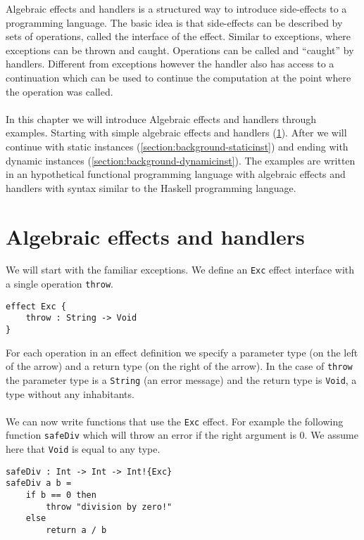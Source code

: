 {
\newcommand\ident[1]{\texttt{#1}}

Algebraic effects and handlers is a structured way to introduce side-effects to a programming language.
The basic idea is that side-effects can be described by sets of operations, called the interface of the effect.
Similar to exceptions, where exceptions can be thrown and caught.
Operations can be called and ``caught'' by handlers.
Different from exceptions however the handler also has access to a continuation which can be used to continue the computation at the point where the operation was called.
\\\\
In this chapter we will introduce Algebraic effects and handlers through examples.
Starting with simple algebraic effects and handlers (\cref{section:background-algeff}). After we will continue with static instances (\cref{section:background-staticinst}) and ending with dynamic instances (\cref{section:background-dynamicinst}). The examples are written in an hypothetical functional programming language with algebraic effects and handlers with syntax similar to the Haskell programming language.

\section{Algebraic effects and handlers} \label{section:background-algeff}
We will start with the familiar exceptions. We define an \ident{Exc} effect interface with a single operation \ident{throw}.

\begin{verbatim}
effect Exc {
	throw : String -> Void
}
\end{verbatim}

For each operation in an effect definition we specify a parameter type (on the left of the arrow) and a return type (on the right of the arrow). In the case of \ident{throw} the parameter type is a \ident{String} (an error message) and the return type is \ident{Void}, a type without any inhabitants.
\\\\
We can now write functions that use the \ident{Exc} effect.
For example the following function \ident{safeDiv} which will throw an error if the right argument is $0$.
We assume here that \ident{Void} is equal to any type.

\begin{verbatim}
safeDiv : Int -> Int -> Int!{Exc}
safeDiv a b =
	if b == 0 then
		throw "division by zero!"
	else
		return a / b
\end{verbatim}

}
